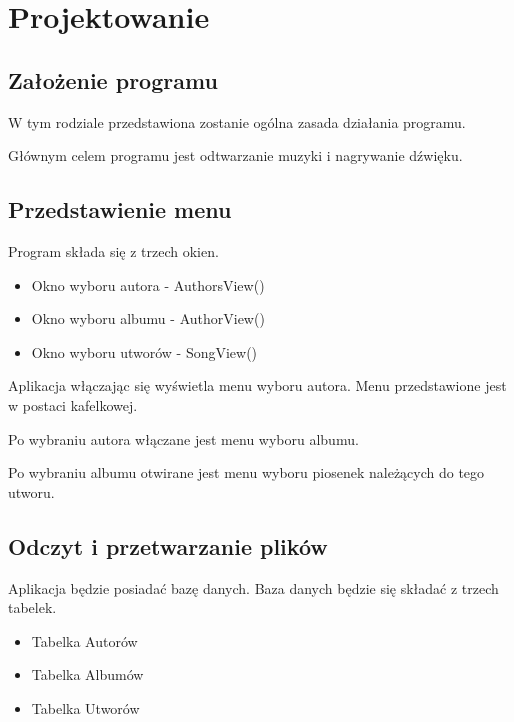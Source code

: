 	\newpage
\section{Projektowanie}		%

\subsection{Założenie programu}
W tym rodziale przedstawiona zostanie ogólna zasada działania programu.

Głównym celem programu jest odtwarzanie muzyki i nagrywanie dźwięku.

\subsection{Przedstawienie menu}
Program składa się z trzech okien.

\begin{itemize}
	\item Okno wyboru autora - AuthorsView()
	\item Okno wyboru albumu - AuthorView()
	\item Okno wyboru utworów - SongView()
\end{itemize}

Aplikacja włączając się wyświetla menu wyboru autora. Menu przedstawione jest w postaci kafelkowej.

Po wybraniu autora włączane jest menu wyboru albumu.

Po wybraniu albumu otwirane jest menu wyboru piosenek należących do tego utworu.

\subsection{Odczyt i przetwarzanie plików}

Aplikacja będzie posiadać bazę danych. Baza danych będzie się składać z trzech tabelek.

\begin{itemize}
	\item Tabelka Autorów
	\item Tabelka Albumów
	\item Tabelka Utworów
\end{itemize}

